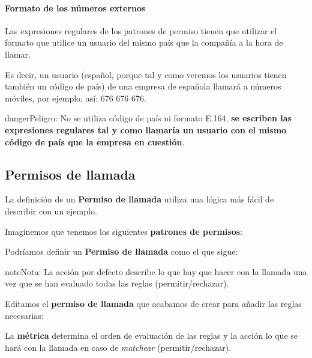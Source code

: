 \documentclass[letterpaper,10pt,spanish]{sphinxmanual}
\begin{document}
\paragraph{Formato de los números externos}

Las expresiones regulares de los patrones de permiso tienen que utilizar el formato que utilice un usuario del mismo país que la compañía a la hora de llamar.

Es decir, un usuario (español, porque tal y como veremos los usuarios tienen también un código de país) de una empresa de española llamará a números móviles, por ejemplo, así: 676 676 676.

\begin{notice}{danger}{Peligro:}
No se utiliza código de país ni formato E.164, \textbf{se escriben las expresiones regulares tal y como llamaría un usuario con el mismo código de país que la empresa en cuestión}.
\end{notice}


\subsection{Permisos de llamada}
\label{pbx_features/call_permissions:id2}
La definición de un \textbf{Permiso de llamada} utiliza una lógica más fácil de describir con un ejemplo.

Imaginemos que tenemos los siguientes \textbf{patrones de permisos}:

\noindent{}

Podríamos definir un \textbf{Permiso de llamada} como el que sigue:

\noindent{}

\begin{notice}{note}{Nota:}
La acción por defecto describe lo que hay que hacer con la llamada una vez que se han evaluado todas las reglas (permitir/rechazar).
\end{notice}

Editamos el \textbf{permiso de llamada} que acabamos de crear para añadir las reglas necesarias:

\noindent{}

La \textbf{métrica} determina el orden de evaluación de las reglas y la acción lo que se hará con la llamada en caso de \emph{matchear} (permitir/rechazar).

\noindent{}
\end{document}
